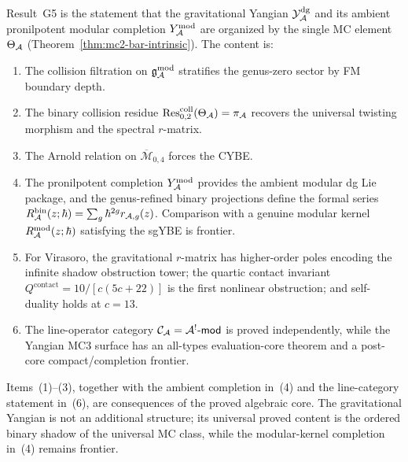 \begin{remark}
\label{rem:thqg-V-g5-synthesis}
Result~G5 is the statement that the gravitational Yangian
$\mathcal{Y}^{\mathrm{dg}}_{\mathcal{A}}$ and its ambient pronilpotent modular completion
$Y^{\mathrm{mod}}_{\mathcal{A}}$ are organized by the single MC element $\Theta_{\mathcal{A}}$
(Theorem~\ref{thm:mc2-bar-intrinsic}). The content is:
\begin{enumerate}[label=\textup{(\arabic*)}]
\item The collision filtration on $\mathfrak{g}_{\mathcal{A}}^{\mathrm{mod}}$ stratifies the
 genus-zero sector by FM boundary depth.
\item The binary collision residue
 $\operatorname{Res}^{\mathrm{coll}}_{0,2}(\Theta_{\mathcal{A}}) = \pi_{\mathcal{A}}$ recovers the
 universal twisting morphism and the spectral $r$-matrix.
\item The Arnold relation on $\overline{\mathcal{M}}_{0,4}$ forces
 the CYBE\@.
\item The pronilpotent completion $Y^{\mathrm{mod}}_{\mathcal{A}}$ provides the ambient
 modular dg Lie package, and the genus-refined binary projections
 define the formal series
 $R^{\mathrm{bin}}_{\mathcal{A}}(z;\hbar)=\sum_g \hbar^{2g}r_{\mathcal{A},g}(z)$.
 Comparison with a genuine modular kernel
 $R^{\mathrm{mod}}_{\mathcal{A}}(z;\hbar)$ satisfying the sgYBE is frontier.
\item For Virasoro, the gravitational $r$-matrix has higher-order
 poles encoding the infinite shadow obstruction tower; the quartic contact
 invariant $Q^{\mathrm{contact}} = 10/[c(5c+22)]$ is the first
 nonlinear obstruction; and self-duality holds at $c = 13$.
\item The line-operator category
 $\mathcal{C}_{\mathcal{A}} = \mathcal{A}^!\text{-}\mathsf{mod}$ is proved independently,
 while the Yangian MC3 surface has an all-types evaluation-core
 theorem and a post-core compact/completion frontier.
\end{enumerate}
Items~(1)--(3), together with the ambient completion in~(4) and the
line-category statement in~(6), are consequences of the proved
algebraic core. The gravitational Yangian is not an additional
structure; its universal proved content is the ordered binary shadow
of the universal MC class, while the modular-kernel completion in~(4)
remains frontier.
\end{remark}
